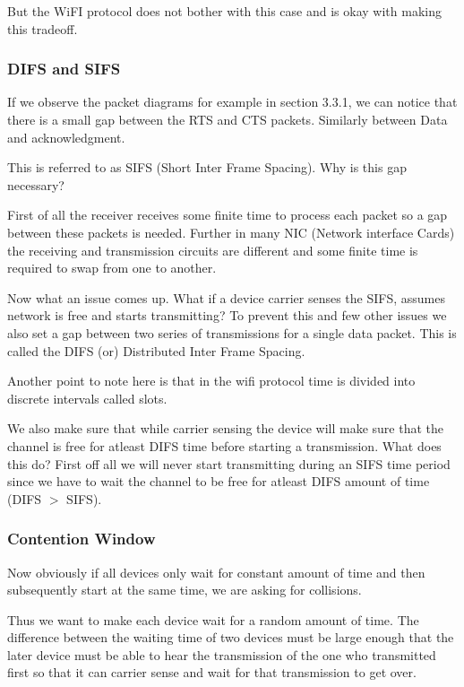 \documentclass[12pt]{article}
\begin{document}
But the WiFI protocol does not bother with this case and is okay with making this tradeoff. 


\subsubsection{DIFS and SIFS}

If we observe the packet diagrams for example in section 3.3.1, we can notice that there 
is a small gap between the RTS and CTS packets. Similarly between Data and acknowledgment. 

This is referred to as SIFS (Short Inter Frame Spacing). Why is this gap necessary? 

First of all the receiver receives some finite time to process each packet so a gap between these 
packets is needed. Further in many NIC (Network interface Cards) the receiving and 
transmission circuits are different and some finite time is required to swap from one to another.

Now what an issue comes up. What if a device carrier senses the SIFS, assumes network is free and starts transmitting? 
To prevent this and few other issues we also set a gap between two series of transmissions for a single 
data packet. This is called the DIFS (or) Distributed Inter Frame Spacing. 

Another point to note here is that in the wifi protocol time is divided into discrete intervals called slots. 

We also make sure that while carrier sensing the device will make sure that the channel is free for atleast DIFS time 
before starting a transmission. What does this do? First off all we will never start transmitting during an SIFS time period
since we have to wait the channel to be free for atleast DIFS amount of time (DIFS $>$ SIFS). 


\subsubsection{Contention Window}
Now obviously if all devices only wait for constant amount of time and then subsequently 
start at the same time, we are asking for collisions. 

Thus we want to make each device wait for a random amount of time. The difference between the waiting time of 
two devices must be large enough that the later device must be able to hear the transmission of the 
one who transmitted first so that it can carrier sense and wait for that transmission to get over. 
\end{document}
